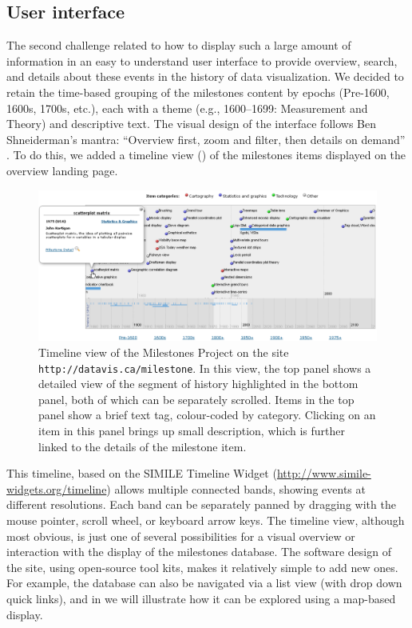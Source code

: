 \subsection{User interface}
The second challenge related to how to display such a large amount of information in an easy to understand user interface to provide overview, search, and details about these events in the history of data visualization. We decided to retain the time-based grouping of the milestones content by epochs (Pre-1600, 1600s, 1700s, etc.), each with a theme (e.g., 1600--1699: Measurement and Theory) and descriptive text. The visual design of the interface follows Ben Shneiderman's mantra: ``Overview first, zoom and filter, then details on demand'' \citep{Shneiderman:1996:IEEE}. To do this, we added a timeline view () of the milestones items displayed on the overview landing page. 

\begin{figure}[!htb]
  \centering
  \includegraphics[width=\textwidth,clip]{fig/datavis-timeline2}
  \caption{Timeline view of the Milestones Project on the site \texttt{http://datavis.ca/milestone}. In this view, the top panel shows a detailed view of the segment of history highlighted in the bottom panel, both of which can be separately scrolled. Items in the top panel show a brief text tag, colour-coded by category. Clicking on an item in this panel brings up small description, which is further linked to the details of the milestone item.}
  \label{fig:datavis-timeline2}
\end{figure}

This timeline, based on the SIMILE Timeline Widget (\url{http://www.simile-widgets.org/timeline}) allows multiple connected bands, showing events at different resolutions.  Each band can be separately panned by dragging with the mouse pointer, scroll wheel, or keyboard arrow keys. The timeline view, although most obvious, is just one of several possibilities for a visual overview or interaction with the display of the milestones database. The software design of the site, using open-source tool kits, makes it relatively simple to add new ones.  For example, the database can also be navigated via a list view (with drop down quick links), and in  we will illustrate how it can be explored using a map-based display.